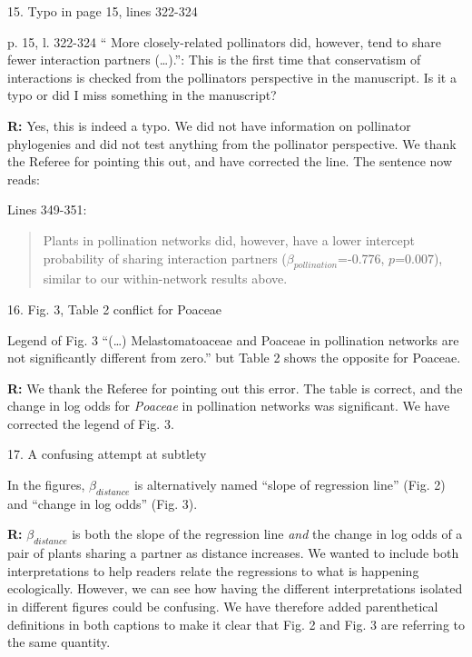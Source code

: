 \documentclass[12pt]{letter}
\newenvironment{refquote}{\bigskip \begin{it}}{\end{it}\smallskip}
\begin{document}
	15. Typo in page 15, lines 322-324


		\begin{refquote}
			p. 15, l. 322-324 “ More closely-related pollinators did, however, tend to share fewer interaction partners (…).”: This is the first time that conservatism of interactions is checked from the pollinators perspective in the manuscript. Is it a typo or did I miss something in the manuscript?
		\end{refquote}


		\textbf{R:} Yes, this is indeed a typo. We did not have information on pollinator phylogenies and did not test anything from the pollinator perspective. We thank the Referee for pointing this out, and have corrected the line. The sentence now reads:


		Lines 349-351:


		\begin{quotation}
			Plants in pollination networks did, however, have a lower intercept probability of sharing interaction partners ($\beta_{pollination}$=-0.776, $p$=0.007), similar to our within-network results above.
		\end{quotation}


	16. Fig. 3, Table 2 conflict for Poaceae


		\begin{refquote}
			Legend of Fig. 3 “(…) Melastomatoaceae and Poaceae in pollination networks are not significantly different from zero.” but Table 2 shows the opposite for Poaceae.
		\end{refquote}


		\textbf{R:} We thank the Referee for pointing out this error. The table is correct, and the change in log odds for \emph{Poaceae} in pollination networks was significant. We have corrected the legend of Fig. 3.


	17. A confusing attempt at subtlety

		\begin{refquote}
			In the figures, $\beta_{distance}$ is alternatively named “slope of regression line” (Fig. 2) and “change in log odds” (Fig. 3).
		\end{refquote}


		\textbf{R:} $\beta_{distance}$ is both the slope of the regression line \emph{and} the change in log odds of a pair of plants sharing a partner as distance increases. We wanted to include both interpretations to help readers relate the regressions to what is happening ecologically. However, we can see how having the different interpretations isolated in different figures could be confusing. We have therefore added parenthetical definitions in both captions to make it clear that Fig. 2 and Fig. 3 are referring to the same quantity.
\end{document}
